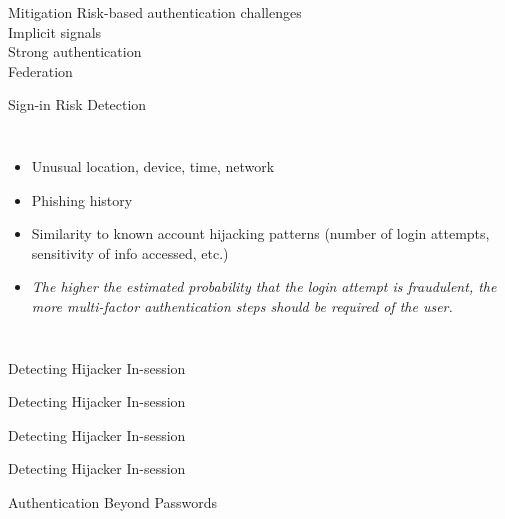\documentclass[nobackground,dvipsnames,table]{beamer}
\begin{document}
\begin{frame}{Mitigation}
    Risk-based authentication challenges\\
    Implicit signals\\
    Strong authentication\\
    Federation
\end{frame}

\begin{frame}{Sign-in Risk Detection}
    \begin{columns}
            \begin{itemize}
                \item Unusual location, device, time, network 
                \item Phishing history
                \item Similarity to known account hijacking patterns (number of login attempts, sensitivity of info accessed, etc.)
                \item \textit{The higher the estimated probability that the login attempt is fraudulent, the more multi-factor authentication steps should be required of the user.}
            \end{itemize}
    \end{columns}
\end{frame}

\begin{frame}{Detecting Hijacker In-session}
    
\end{frame}

\begin{frame}{Detecting Hijacker In-session}
    
\end{frame}

\begin{frame}{Detecting Hijacker In-session}
    
\end{frame}

\begin{frame}{Detecting Hijacker In-session}
    
\end{frame}

\begin{frame}{Authentication Beyond Passwords}
    
\end{frame}
\end{document}
